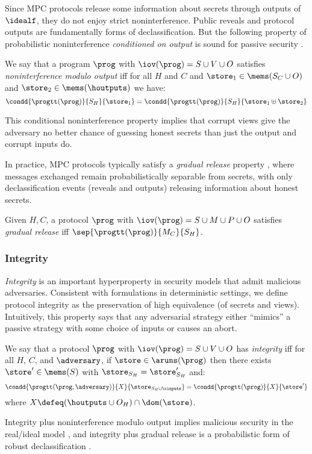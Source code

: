 Since MPC protocols release some information about secrets through
outputs of $\idealf$, they do not enjoy strict noninterference.
Public reveals and protocol outputs are fundamentally forms of
declassification. But the following property of probabilistic
noninterference \emph{conditioned on output} is sound for passive
security \cite{skalka-near-ppdp24}.
\begin{definition}
  \label{definition-NIMO}
  We say that a program $\prog$ with $\iov(\prog) = S \cup V \cup O$
  satisfies \emph{noninterference modulo output}
  iff for all $H$ and $C$ and $\store_1 \in \mems(S_C \cup O)$ and $\store_2 \in \mems(\houtputs)$
  we have:
  $$
  \condd{\progtt(\prog)}{S_H}{\store_1} = \condd{\progtt(\prog)}{S_H}{\store_1 \uplus \store_2}
 $$
\end{definition}
This conditional noninterference property implies that
corrupt views give the adversary no better chance of guessing honest
secrets than just the output and corrupt inputs do.

In practice, MPC protocols typically satisfy a \emph{gradual
release} property \cite{sabelfeld2009declassification}, where messages
exchanged remain probabilistically separable from secrets, with only
declassification events (reveals and outputs) releasing information
about honest secrets.  
\begin{definition}
  Given $H,C$, a protocol $\prog$ with $\iov(\prog) = S \cup M \cup P \cup O$
  satisfies \emph{gradual release} iff
  $\sep{\progtt(\prog)}{M_C}{S_H}$.
\end{definition}

\subsubsection{Integrity}

\emph{Integrity} is an important hyperproperty in security models that
admit malicious adversaries. Consistent with formulations in
deterministic settings, we define protocol integrity as the
preservation of high equivalence (of secrets and views). Intuitively,
this property says that any adversarial strategy either ``mimics'' a
passive strategy with some choice of inputs or causes an abort.
\begin{definition}[Integrity]
  \label{def-integrity}
  We say that a protocol $\prog$ with $\iov(\prog) = S \cup V \cup O$ has
  \emph{integrity} iff for all $H$, $C$, and $\adversary$,
  if $\store \in \aruns(\prog)$ 
  then there exists $\store' \in \mems(S)$ with $\store_{S_H} = \store'_{S_H} $ and:
    $$
    \condd{\progtt(\prog,\adversary)}{X}{\store_{S_H \cup \cinputs}} =
    \condd{\progtt(\prog)}{X}{\store'}
    $$ 
  where $X \defeq (\houtputs \cup O_H) \cap \dom(\store)$. 
\end{definition}
Integrity plus noninterference modulo output implies malicious security
in the real/ideal model \cite{skalka-near-ppdp24}, and integrity plus
gradual release is a probabilistic form of robust declassification
\cite{sabelfeld2009declassification}.


